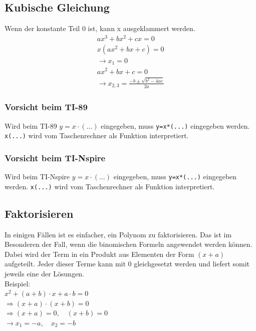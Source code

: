 \subsection{Kubische Gleichung}
Wenn der konstante Teil 0 ist, kann x ausgeklammert werden. 
\[ \boxed{\begin{array}{l}
ax^3 + bx^2 + cx = 0 \\
x(ax^2 + bx + c) = 0 \\
\rightarrow x_1 = 0 \\
ax^2 + bx + c = 0 \\
\rightarrow x_{2,3} = \frac{-b\pm\sqrt{b^2-4ac}}{2a}
\end{array}} \]

\ifti
\subsubsection{Vorsicht beim TI-89}
Wird beim TI-89 $y = x \cdot (\ldots)$ eingegeben, muss \verb!y=x*(...)! 
eingegeben werden. \verb!x(...)! wird vom Taschenrechner als Funktion 
interpretiert. 
\fi

\ifnspire
\subsubsection{Vorsicht beim TI-Nspire}
Wird beim TI-Nspire $y = x \cdot (\ldots)$ eingegeben, muss \verb!y=x*(...)! 
eingegeben werden. \verb!x(...)! wird vom Taschenrechner als Funktion 
interpretiert. 
\fi

\subsection{Faktorisieren}
In einigen Fällen ist es einfacher, ein Polynom zu faktorisieren. Das ist 
im Besonderen der Fall, wenn die binomischen Formeln angewendet werden können. 
Dabei wird der Term in ein Produkt aus Elementen der Form $(x+a)$ aufgeteilt. 
Jeder dieser Terme kann mit 0 gleichgesetzt werden und liefert somit jeweils 
eine der Lösungen. \\
Beispiel: \\
$x^2 + (a + b) \cdot x + a \cdot b = 0 $ \\
$\Rightarrow (x + a) \cdot (x + b) = 0$ \\
$\Rightarrow (x + a) =0, \quad (x + b) = 0$ \\
$\rightarrow x_1 = -a, \quad x_2 = -b$

\ifti
